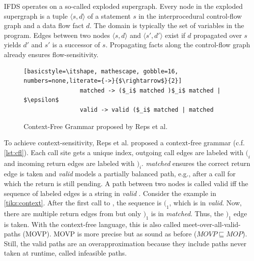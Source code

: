 \documentclass[../draft.tex]{subfiles}
\begin{document}
    IFDS operates on a so-called exploded supergraph. 
    Every node in the exploded supergraph is a tuple $\langle s, d \rangle$ of a statement $s$ in the interprocedural control-flow graph and a data flow fact $d$. 
    The domain is typically the set of variables in the program. 
    Edges between two nodes $\langle s, d \rangle$ and $\langle s', d' \rangle$ exist if $d$ propagated over $s$ yields $d'$ and $s'$ is a successor of $s$. 
    Propagating facts along the control-flow graph already ensures flow-sensitivity.

    \begin{figure}[ht]
        \centering
        \begin{adjustbox}{max width=\columnwidth}
            \begin{lstlisting}[basicstyle=\itshape, mathescape, gobble=16, numbers=none,literate={->}{$\rightarrow$}{2}]
                matched -> ($_i$ matched )$_i$ matched | $\epsilon$
                valid -> valid ($_i$ matched | matched
            \end{lstlisting}
        \end{adjustbox}
        \caption{Context-Free Grammar proposed by Reps et al.\cite{Reps1995}}
        \label{lst:cfl}
    \end{figure}

    To achieve context-sensitivity, Reps et al. proposed a context-free grammar (c.f. \autoref{lst:cfl}). 
    Each call site gets a unique index, outgoing call edges are labeled with $(_i$ and incoming return edges are labeled with $)_i$. 
    \textit{matched} ensures the correct return edge is taken and \textit{valid} models a partially balanced path, e.g., after a call for which the return is still pending.
    A path between two nodes is called valid iff the sequence of labeled edges is a string in \textit{valid} \cite{Reps1995}. 
    Consider the example in \autoref{tikz:context}. 
    After the first call to , the sequence is $(_1$, which is in \textit{valid}. 
    Now, there are multiple return edges from  but only $)_1$ is in \textit{matched}. 
    Thus, the $)_1$ edge is taken. 
    With the context-free language, this is also called meet-over-all-valid-paths (MOVP). MOVP is more precise but as sound as before ($\mathit{MOVP} \sqsubseteq \mathit{MOP}$). 
    Still, the valid paths are an overapproximation because they include paths never taken at runtime, called infeasible paths.
\end{document}
